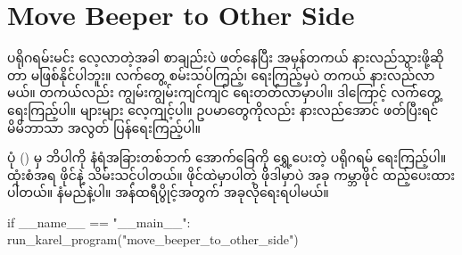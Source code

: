 \section{Move Beeper to Other Side}
ပရိုဂရမ်းမင်း လေ့လာတဲ့အခါ စာချည်းပဲ ဖတ်နေပြီး အမှန်တကယ် နားလည်သွားဖို့ဆိုတာ မဖြစ်နိုင်ပါဘူး။ လက်တွေ့ စမ်းသပ်ကြည့်၊ ရေးကြည့်မှပဲ တကယ် နားလည်လာမယ်။ တကယ်လည်း ကျွမ်းကျွမ်းကျင်ကျင် ရေးတတ်လာမှာပါ။ ဒါကြောင့် လက်တွေ့ရေးကြည့်ပါ။ များများ လေ့ကျင့်ပါ။ ဥပမာတွေကိုလည်း နားလည်အောင် ဖတ်ပြီးရင် မိမိဘာသာ အလွတ် ပြန်ရေးကြည့်ပါ။ 

ပုံ (\fRefNo{\ref{fig:mbtos}}) မှ ဘိပါကို နံရံအခြားတစ်ဘက် အောက်ခြေကို ရွှေ့ပေးတဲ့ ပရိုဂရမ် ရေးကြည့်ပါ။  ထုံးစံအရ  ဖိုင်နဲ့ သိမ်းသင့်ပါတယ်။ ဖိုင်ထဲမှာပါတဲ့  ဖိုဒါမှာပဲ အခု ကမ္ဘာဖိုင် ထည့်ပေးထားပါတယ်။  နံမည်နဲ့ပါ။ အန်ထရီပွိုင့်အတွက် အခုလိုရေးရပါမယ်။
%
\begin{py}
if __name__ == "__main__":
    run_karel_program("move_beeper_to_other_side")
\end{py}

\begin{figure}[tbh!]
\caption{} 
\label{fig:mbtos}
\end{figure}




%

%

